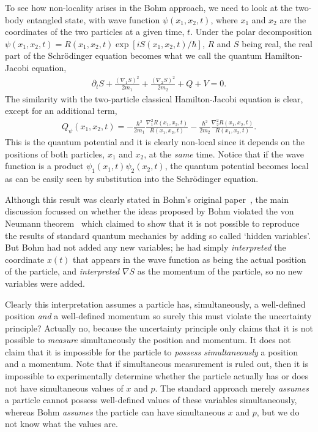 \documentclass[11pt]{article}
\begin{document}
To see how non-locality arises in the Bohm approach, we need to look at the two-body entangled state, with wave function $\psi(x_1, x_2, t)$, where $x_1$ and $x_2$ are the coordinates of the two particles at a given time, $t$.  Under the polar decomposition  $\psi(x_1, x_2, t)= R(x_1, x_2, t)\exp[iS(x_1, x_2, t)/\hbar]$, $R$ and $S$ being real, the real part of the Schr\"{o}dinger equation becomes what we call the quantum Hamilton-Jacobi equation,
\begin{eqnarray}
\partial_t S+\frac{(\nabla_1S)^2}{2m_1}+\frac{(\nabla_{2} S)^2}{2m_2} + Q+V=0.	\label{eq:2body}
\end{eqnarray}
The similarity with the two-particle classical Hamilton-Jacobi equation is clear, except for an additional term,
\begin{eqnarray}
Q_\psi(x_1, x_2, t)=-\frac{\hbar^2}{2m_1}\frac{\nabla_1^2R(x_1,x_2,t)}{R(x_1,x_2,t)}-\frac{\hbar^2}{2m_2}\frac{\nabla_2^2R(x_1,x_2,t)}{R(x_1,x_2,t)}.	\label{eq:QPE}
\end{eqnarray}
This is the quantum potential and it is clearly non-local since it depends on the positions of both particles, $x_1$ and $x_2$, at the {\em same} time.  Notice that if the wave function is a product $\psi_1(x_1,t)\psi_2(x_2,t)$, the quantum potential becomes local as can be easily seen by substitution into the Schr\"{o}dinger equation.


Although this result was clearly stated in Bohm's original paper~\cite{db52}, the main discussion focussed on whether the ideas proposed by Bohm violated the von Neumann theorem~\cite{vn55} 
which claimed to show that  it is not possible to reproduce the results of standard quantum mechanics by adding so called `hidden variables'.  But Bohm had not added any new variables;  he had simply {\em interpreted} the coordinate $x(t)$ that appears in the wave function as being the actual position of the particle,  and {\em interpreted} $\nabla S$ as the momentum of the particle, so   no new variables were added.   

Clearly this interpretation assumes a particle has, simultaneously, a well-defined position {\em and} a well-defined momentum so  surely this must violate the uncertainty principle?  Actually no, because the uncertainty principle only claims that it is not possible to {\em measure} simultaneously the position and momentum.  It does not claim that it is  impossible for the particle to {\em possess simultaneously} a position and a momentum.  Note that if simultaneous measurement is ruled out, then it is impossible to experimentally determine whether the particle actually has or does not have simultaneous values of $x$ and $p$.  The standard approach merely {\em assumes} a particle cannot possess well-defined values of these variables simultaneously, whereas Bohm {\em assumes} the particle can have simultaneous $x$ and $p$, but we do not know what the values are.
\end{document}
